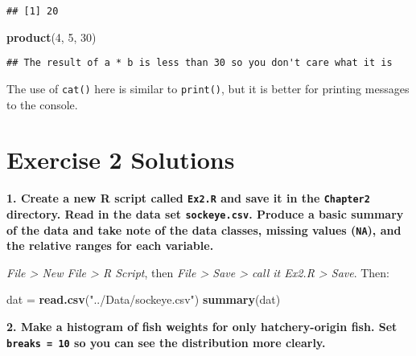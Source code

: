 \documentclass[]{book}
\newenvironment{Shaded}{\begin{snugshade}}{\end{snugshade}}
\newcommand{\KeywordTok}[1]{\textcolor[rgb]{0.13,0.29,0.53}{\textbf{#1}}}
\newcommand{\DataTypeTok}[1]{\textcolor[rgb]{0.13,0.29,0.53}{#1}}
\newcommand{\DecValTok}[1]{\textcolor[rgb]{0.00,0.00,0.81}{#1}}
\newcommand{\StringTok}[1]{\textcolor[rgb]{0.31,0.60,0.02}{#1}}
\newcommand{\OperatorTok}[1]{\textcolor[rgb]{0.81,0.36,0.00}{\textbf{#1}}}
\newcommand{\NormalTok}[1]{#1}
\theoremstyle{definition}
\theoremstyle{definition}
\theoremstyle{definition}
\theoremstyle{remark}
\begin{document}
\begin{verbatim}
## [1] 20
\end{verbatim}

\begin{Shaded}
\begin{Highlighting}[]
\KeywordTok{product}\NormalTok{(}\DecValTok{4}\NormalTok{, }\DecValTok{5}\NormalTok{, }\DecValTok{30}\NormalTok{)}
\end{Highlighting}
\end{Shaded}

\begin{verbatim}
## The result of a * b is less than 30 so you don't care what it is
\end{verbatim}

The use of \texttt{cat()} here is similar to \texttt{print()}, but it is
better for printing messages to the console.

\hypertarget{ex2-answers}{\section*{Exercise 2
Solutions}\label{ex2-answers}}

\textbf{1. Create a new R script called \texttt{Ex2.R} and save it in
the \texttt{Chapter2} directory. Read in the data set
\texttt{sockeye.csv}. Produce a basic summary of the data and take note
of the data classes, missing values (\texttt{NA}), and the relative
ranges for each variable.}

\emph{File \textgreater{} New File \textgreater{} R Script}, then
\emph{File \textgreater{} Save \textgreater{} call it Ex2.R
\textgreater{} Save}. Then:

\begin{Shaded}
\begin{Highlighting}[]
\NormalTok{dat =}\StringTok{ }\KeywordTok{read.csv}\NormalTok{(}\StringTok{"../Data/sockeye.csv"}\NormalTok{)}
\KeywordTok{summary}\NormalTok{(dat)}
\end{Highlighting}
\end{Shaded}

\textbf{2. Make a histogram of fish weights for only hatchery-origin
fish. Set \texttt{breaks\ =\ 10} so you can see the distribution more
clearly.}

\begin{Shaded}
\end{Shaded}
\end{document}
